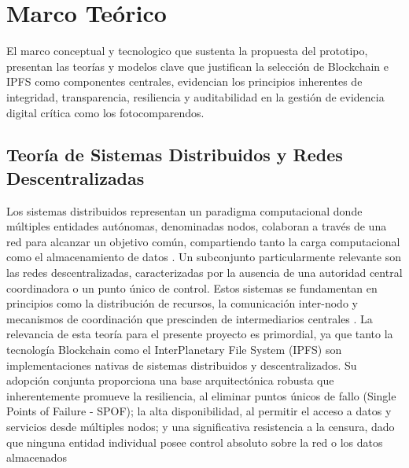 \section{\large Marco Teórico}
El marco conceptual y tecnologico que sustenta la propuesta del prototipo, presentan las teorías y modelos clave que justifican la selección de Blockchain e IPFS como componentes centrales, evidencian los principios inherentes de integridad, transparencia, resiliencia y auditabilidad en la gestión de evidencia digital crítica como los fotocomparendos.
\subsection{Teoría de Sistemas Distribuidos y Redes Descentralizadas} 

Los sistemas distribuidos representan un paradigma computacional donde múltiples entidades autónomas, denominadas nodos, colaboran a través de una red para alcanzar un objetivo común, compartiendo tanto la carga computacional como el almacenamiento de datos \parencite{vanSteen2017}.
Un subconjunto particularmente relevante son las redes descentralizadas, caracterizadas por la ausencia de una autoridad central coordinadora o un punto único de control. Estos sistemas se fundamentan en principios como la distribución de recursos, la comunicación inter-nodo y mecanismos de coordinación que prescinden de intermediarios centrales \parencite{coulouris2011}.
La relevancia de esta teoría para el presente proyecto es primordial, ya que tanto la tecnología Blockchain \parencite{nakamoto2008bitcoin} como el InterPlanetary File System (IPFS) \parencite{benet2014ipfs} son implementaciones nativas de sistemas distribuidos y descentralizados.
Su adopción conjunta proporciona una base arquitectónica robusta que inherentemente promueve la resiliencia, al eliminar puntos únicos de fallo (Single Points of Failure - SPOF); la alta disponibilidad, al permitir el acceso a datos y servicios desde múltiples nodos; y una significativa resistencia a la censura, dado que ninguna entidad individual posee control absoluto sobre la red o los datos almacenados \parencite{antonopoulos2023mastering} 

